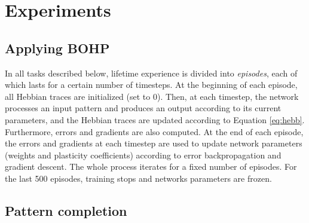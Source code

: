 \documentclass{article}
\begin{document}
\section{Experiments}

\subsection{Applying BOHP}

In all tasks described below, lifetime experience is divided into
\emph{episodes}, each of which lasts for a certain number of timesteps. At the
beginning of each episode, all Hebbian traces are initialized (set to 0). Then,
at each timestep, the network processes an input pattern and produces an output
according to its current parameters, and the Hebbian traces are updated
according to Equation \ref{eq:hebb}. Furthermore, errors and gradients are also
computed. At the end of each episode, the errors and gradients at each timestep
are used to update network parameters (weights and plasticity coefficients)
according to error backpropagation and gradient descent. The whole process
iterates for a fixed number of episodes. For the last 500 episodes, training
stops and networks parameters are frozen.


\subsection{Pattern completion}
\end{document}
